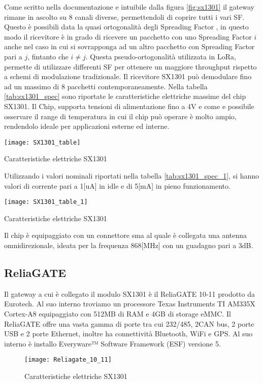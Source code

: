 Come scritto nella documentazione   e intuibile dalla
figura \ref{fig:sx1301} il gateway rimane in ascolto su 8 
canali diverse,  permettendoli di coprire tutti i vari SF. 
Questo è possibili data la quasi ortogonalità degli Spreading Factor
, in questo modo il ricevitore è in grado di ricevere un pacchetto
con uno Spreading Factor $i$ anche nel caso in cui si sovrapponga ad un altro
pacchetto con Spreading Factor pari a $j$, fintanto che $i\neq j$. Questa
pseudo-ortogonalità utilizzata in LoRa, permette di utilizzare differenti SF per
ottenere un maggiore throughput rispetto a schemi di modulazione tradizionale.
Il ricevitore  SX1301 può demodulare fino ad un massimo di 8 pacchetti
contemporaneamente.
Nella tabella \ref{tab:sx1301_spec} sono riportate le caratteristiche elettriche
massime del  chip SX1301. Il Chip, supporta tensioni di
alimentazione fino a 4V e  come e possibile osservare il range di temperatura in cui il
chip può operare è molto ampio, rendendolo ideale per applicazioni esterne ed
interne. 

\begin{table}[h]
\centering 
\texttt{[image: SX1301\_table]}
\caption{Caratteristiche elettriche SX1301}
\label{tab:sx1301_spec}
\end{table}
Utilizzando i valori nominali riportati nella tabella \ref{tab:sx1301_spec_1},
si hanno valori di corrente pari a 1[uA] in idle  e di 5[mA] in pieno
funzionamento.
\begin{table}[h]
\centering 
\texttt{[image: SX1301\_table\_1]}
\caption{Caratteristiche elettriche SX1301}
\label{tab:sx1301_spec_1}
\end{table}
Il chip è equipaggiato con un connettore sma al quale è collegata una
antenna omnidirezionale, ideata per la frequenza 868[MHz] con un guadagno pari a 3dB.

\subsection{ReliaGATE}
Il gateway a cui è collegato il modulo SX1301 è il ReliaGATE 10-11 prodotto da
Eurotech. Al suo interno troviamo un processore Texas Instruments TI AM335X Cortex-A8 
equipaggiato con 512MB di RAM e 4GB di storage eMMC. Il ReliaGATE offre una
vasta gamma di porte tra cui 232/485, 2CAN bus, 2 porte USB e 2 porte Ethernet,
inoltre ha connettività Bluetooth, WiFi e GPS. Al suo interno è installo
Everyware™ Software Framework (ESF) versione 5.
\begin{figure}[h]
\centering 
\texttt{[image: Reliagate\_10\_11]}
\caption{Caratteristiche elettriche SX1301}
\label{fig:ReliaGATE}
\end{figure}


